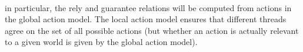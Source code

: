\begin{definition}
\[\begin{array}{L}
\end{array}
\]
\end{definition}

in particular, the rely and guarantee relations will be
computed from actions in the global action model. The local action
model ensures that different threads agree on the set of all possible
actions (but whether an action is actually relevant to a given world
is given by the global action model).


